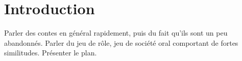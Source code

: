 \section{Introduction}

Parler des contes en général rapidement, puis du fait qu'ils sont un peu abandonnés. Parler du jeu de rôle, jeu de société oral comportant de fortes similitudes.
Présenter le plan.

\clearpage
